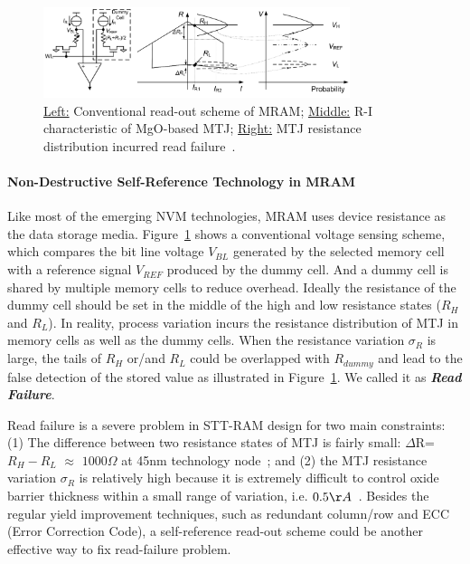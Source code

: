 \begin{figure}
\centering
\vspace{-10pt}
\includegraphics[width=0.8\textwidth]{./figure/5_selfref.pdf}
\vspace{-10pt}
\caption{\underline{Left:} Conventional read-out scheme of MRAM; \underline{Middle:} R-I characteristic of MgO-based MTJ; \underline{Right:} MTJ resistance distribution incurred read failure~\cite{Li09}.}
\label{selfref}
\vspace{-10pt}
\end{figure}

\paragraph{Non-Destructive Self-Reference Technology in MRAM} Like most of the emerging NVM technologies, MRAM uses device resistance as the data storage media. Figure~\ref{selfref} shows a conventional voltage sensing scheme, which compares the bit line voltage $V_{BL}$ generated by the selected memory cell with a reference signal $V_{REF}$ produced by the dummy cell. And a dummy cell is shared by multiple memory cells to reduce overhead. Ideally the resistance of the dummy cell should be set in the middle of the high and low resistance states ($R_H$ and $R_L$). In reality, process variation incurs the resistance distribution of MTJ in memory cells as well as the dummy cells. When the resistance variation $\sigma_R$ is large, the tails of $R_H$ or/and $R_L$ could be overlapped with $R_{dummy}$ and lead to the false detection of the stored value as illustrated in Figure~\ref{selfref}. We called it as \textbf{\emph{Read Failure}}.

Read failure is a severe problem in STT-RAM design for two main constraints: (1) The difference between two resistance states of MTJ is fairly small: $\Delta$R=$R_H-R_L$ $\approx$ $1000\Omega$ at 45nm technology node~\cite{Li09}; and (2) the MTJ resistance variation $\sigma_R$ is relatively high because it is extremely difficult to control oxide barrier thickness within a small range of variation, i.e. $0.5{\AA}$~\cite{Jeong03}. Besides the regular yield improvement techniques, such as redundant column/row and ECC (Error Correction Code), a self-reference read-out scheme could be another effective way to fix read-failure problem.


